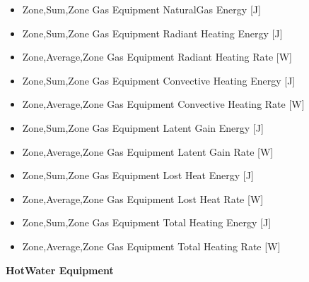 \begin{itemize}
\item
  Zone,Sum,Zone Gas Equipment NaturalGas Energy {[}J{]}
\item
  Zone,Sum,Zone Gas Equipment Radiant Heating Energy {[}J{]}
\item
  Zone,Average,Zone Gas Equipment Radiant Heating Rate {[}W{]}
\item
  Zone,Sum,Zone Gas Equipment Convective Heating Energy {[}J{]}
\item
  Zone,Average,Zone Gas Equipment Convective Heating Rate {[}W{]}
\item
  Zone,Sum,Zone Gas Equipment Latent Gain Energy {[}J{]}
\item
  Zone,Average,Zone Gas Equipment Latent Gain Rate {[}W{]}
\item
  Zone,Sum,Zone Gas Equipment Lost Heat Energy {[}J{]}
\item
  Zone,Average,Zone Gas Equipment Lost Heat Rate {[}W{]}
\item
  Zone,Sum,Zone Gas Equipment Total Heating Energy {[}J{]}
\item
  Zone,Average,Zone Gas Equipment Total Heating Rate {[}W{]}
\end{itemize}

\textbf{HotWater Equipment}

